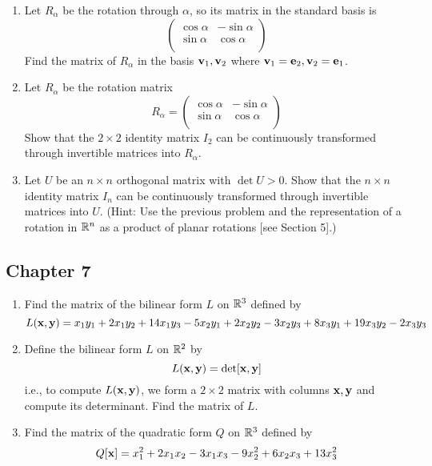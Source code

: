 \documentclass[../psets.tex]{subfiles}
\begin{document}
\begin{enumerate}[label={\textbf{6.\arabic*.}}]
    \item Let $R_\alpha$ be the rotation through $\alpha$, so its matrix in the standard basis is
    \begin{equation*}
        \begin{pmatrix}
            \cos\alpha & -\sin\alpha\\
            \sin\alpha & \cos\alpha\\
        \end{pmatrix}
    \end{equation*}
    Find the matrix of $R_\alpha$ in the basis $\mathbf{v}_1,\mathbf{v}_2$ where $\mathbf{v}_1=\mathbf{e}_2,\mathbf{v}_2=\mathbf{e}_1$.
    \item Let $R_\alpha$ be the rotation matrix
    \begin{equation*}
        R_\alpha =
        \begin{pmatrix}
            \cos\alpha & -\sin\alpha\\
            \sin\alpha & \cos\alpha\\
        \end{pmatrix}
    \end{equation*}
    Show that the $2\times 2$ identity matrix $I_2$ can be continuously transformed through invertible matrices into $R_\alpha$.
    \item Let $U$ be an $n\times n$ orthogonal matrix with $\det U>0$. Show that the $n\times n$ identity matrix $I_n$ can be continuously transformed through invertible matrices into $U$. (Hint: Use the previous problem and the representation of a rotation in $\mathbb{R}^n$ as a product of planar rotations [see Section 5].)
\end{enumerate}


\subsection*{Chapter 7}
\begin{enumerate}[label={\textbf{1.\arabic*.}}]
    \item Find the matrix of the bilinear form $L$ on $\mathbb{R}^3$ defined by
    \begin{equation*}
        L(\mathbf{x},\mathbf{y}) = x_1y_1+2x_1y_2+14x_1y_3-5x_2y_1+2x_2y_2-3x_2y_3+8x_3y_1+19x_3y_2-2x_3y_3
    \end{equation*}
    \item Define the bilinear form $L$ on $\mathbb{R}^2$ by
    \begin{equation*}
        L(\mathbf{x},\mathbf{y}) = \det[\mathbf{x},\mathbf{y}]
    \end{equation*}
    i.e., to compute $L(\mathbf{x},\mathbf{y})$, we form a $2\times 2$ matrix with columns $\mathbf{x},\mathbf{y}$ and compute its determinant. Find the matrix of $L$.
    \item Find the matrix of the quadratic form $Q$ on $\mathbb{R}^3$ defined by
    \begin{equation*}
        Q[\mathbf{x}] = x_1^2+2x_1x_2-3x_1x_3-9x_2^2+6x_2x_3+13x_3^2
    \end{equation*}
\end{enumerate}
\end{document}
